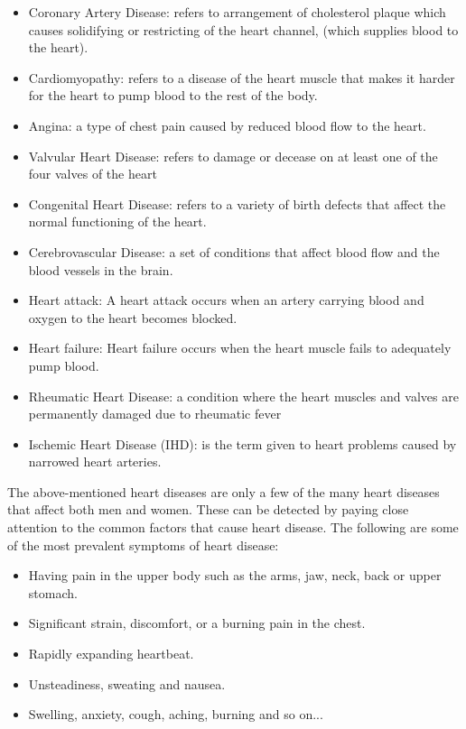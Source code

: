 \begin{itemize}
	\item{Coronary Artery Disease: refers to arrangement of cholesterol plaque which causes solidifying or restricting of the heart channel, (which supplies blood to the heart).}
	\item{Cardiomyopathy: refers to a disease of the heart muscle that makes it harder for the heart to pump blood to the rest of the body.}
	\item{Angina: a type of chest pain caused by reduced blood flow to the heart.}
	\item{Valvular Heart Disease: refers to damage or decease on at least one of the four valves of the heart}
	\item{Congenital Heart Disease: refers to a variety of birth defects that affect the normal functioning of the heart.}
	\item{Cerebrovascular Disease: a set of conditions that affect blood flow and the blood vessels in the brain.}
	\item{Heart attack: A heart attack occurs when an artery carrying blood and oxygen to the heart becomes blocked.}
	\item {Heart failure: Heart failure occurs when the heart muscle fails to adequately pump blood.}
	\item{Rheumatic Heart Disease: a condition where the heart muscles and valves are permanently damaged due to rheumatic fever}
	\item{Ischemic Heart Disease (IHD): is the term given to heart problems caused by narrowed heart arteries.}
\end{itemize}

The above-mentioned heart diseases are only a few of the many heart diseases that affect both men and women. These can be detected by paying close attention to the common factors that cause heart disease. The following are some of the most prevalent symptoms of heart disease:

\begin{itemize}
	\item{Having pain in the upper body such as the arms, jaw, neck, back or upper stomach.}
	\item{Significant strain, discomfort, or a burning pain in the chest.}
	\item{Rapidly expanding heartbeat.}
	\item{Unsteadiness, sweating and nausea.}
	\item{Swelling, anxiety, cough, aching, burning and so on...}
\end{itemize}

